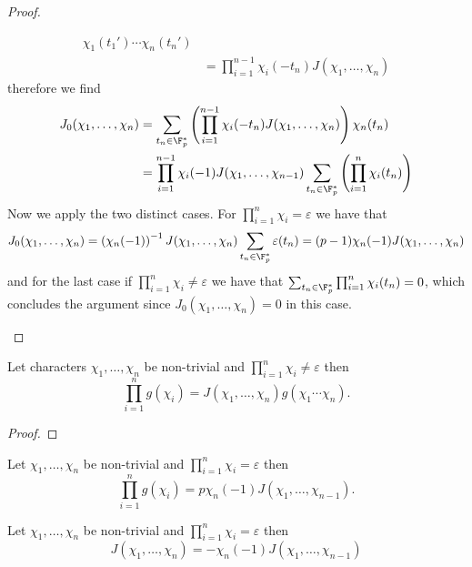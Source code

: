\begin{proof}
\begin{enumerate}[i.]
\begin{align*}
             \chi_1(t_1') \cdots \chi_n(t_n') \\
             &= \prod_{i=1}^{n-1} \chi_i(-t_n) J(\chi_1, \dots, \chi_n)
         \end{align*}
         therefore we find 
         \begin{align*}
            J_0(\chi_1, \dots, \chi_n) 
            &= \sum_{t_n \in \F_p^{\ast}} \left( \prod_{i=1}^{n-1} \chi_i(-t_n)
            J(\chi_1,\dots, \chi_n)\right) \chi_n(t_n) \\
            &= \prod_{i=1}^{n-1} \chi_i(-1) J(\chi_1,\dots,\chi_{n-1}) \sum_{t_n
            \in \F_p^\ast}\left( \prod_{i=1}^{n} \chi_i(t_n) \right) 
         \end{align*}
         Now we apply the two distinct cases. For \(\prod_{i=1}^{n} \chi_i =
         \varepsilon\) we have that 
         \[
            J_0(\chi_1,\dots,\chi_n) = \left( \chi_n(-1) \right)^{-1} J(\chi_1,
            \dots, \chi_n) \sum_{t_n \in \F_p^\ast} \varepsilon(t_n) = (p-1)
            \chi_n(-1) J(\chi_1,\dots,\chi_n)
         \]
         and for the last case if \(\prod_{i = 1}^n \chi_i \neq  \varepsilon\)
         we have that \(\sum_{t_n \in \F_p^\ast} \prod_{i=1}^n \chi_i(t_n) =
         0\), which concludes the argument since \(J_0(\chi_1, \dots, \chi_n)=
         0\) in this case.
   \end{enumerate}
\end{proof}

\begin{theorem}
   Let characters \(\chi_1, \dots, \chi_n\) be non-trivial and  \(\prod_{i =
   1}^{n} \chi_i \neq  \varepsilon\) then 
   \[
      \prod_{i=1}^{n} g(\chi_i) = J(\chi_1, \dots, \chi_n) g(\chi_1 \cdots
      \chi_n).
   \] 
\end{theorem}

\begin{proof}
\end{proof}

\begin{corollary}
   Let \(\chi_1,\dots,\chi_n\) be non-trivial and \(\prod_{i=1}^n \chi_i = 
   \varepsilon\) then  
   \[
      \prod_{i=1}^n g(\chi_i) = p\chi_n(-1) J(\chi_1,\dots,\chi_{n-1}).
   \] 
\end{corollary}

\begin{corollary}
   Let \(\chi_1,\dots,\chi_n\) be non-trivial and \(\prod_{i=1}^n \chi_i = 
   \varepsilon\) then  
   \[
      J(\chi_1, \dots, \chi_n) = -\chi_n(-1) J(\chi_1,\dots,\chi_{n-1})
   \] 
\end{corollary}

